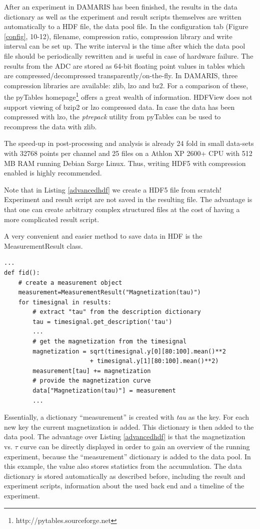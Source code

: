 \documentclass[12pt, a4paper, BCOR10mm, twoside, titlepage, headinclude]{scrbook}
\begin{document}
After an experiment in \textsf{DAMARIS} has been finished, the results in the data dictionary as well as the experiment and result scripts themselves are written automatically to a \textsf{HDF} file, the data pool file.\label{comp} In the configuration tab (Figure \ref{config}, 10-12), filename, compression ratio, compression library and write interval can be set up.
The write interval is the time after which the data pool file should be periodically rewritten and is useful in case of hardware failure. 
The results from the ADC are stored as 64-bit floating point values in tables which are compressed/decompressed  transparently/on-the-fly. 
In \textsf{DAMARIS}, three compression libraries are available: zlib, lzo and bz2. For a comparison of these, the \textsf{pyTables} homepage\footnote{http://pytables.sourceforge.net} offers a great wealth of information.
\textsf{HDFView} does not support viewing of bzip2 or lzo compressed data. In case the data has been compressed with lzo, the \emph{ptrepack} utility from \textsf{pyTables} can be used to recompress the data with zlib.

The speed-up in post-processing and analysis is already 24 fold in small data-sets with 32768 points per channel and 25 files on a Athlon XP 2600+ CPU with 512 MB RAM running Debian Sarge Linux. Thus, writing \textsf{HDF5} with compression enabled is highly recommended.

Note that in Listing \ref{advancedhdf} we create a \textsf{HDF5} file from scratch! Experiment and result script are not saved in the resulting file. The advantage is that one can create arbitrary complex structured files at the cost of having a more complicated result script.

A very convenient and easier method to save data in HDF is the MeasurementResult class.
\begin{lstlisting}
...
def fid():
	# create a measurement object
	measurement=MeasurementResult("Magnetization(tau)")
	for timesignal in results:
		# extract "tau" from the description dictionary
		tau = timesignal.get_description('tau')
		...
		# get the magnetization from the timesignal
		magnetization = sqrt(timesignal.y[0][80:100].mean()**2 
						+ timesignal.y[1][80:100].mean()**2)
		measurement[tau] += magnetization
		# provide the magnetization curve
		data["Magnetization(tau)"] = measurement
		...
\end{lstlisting}
Essentially, a dictionary ``measurement'' is created with \emph{tau} as the key. For each new key the current magnetization is added. This dictionary is then added to the data pool. The advantage over Listing \ref{advancedhdf} is that the magnetization vs. $\tau$ curve can be directly displayed in order to gain an overview of the running experiment, because the ``measurement'' dictionary is added to the data pool. In this example, the value also stores statistics from the accumulation. The data dictionary is stored automatically as described before, including the result and experiment scripts, information about the used back end and a timeline of the experiment.
\end{document}
